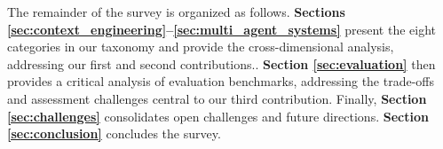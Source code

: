 The remainder of the survey is organized as follows. \textbf{Sections \ref{sec:context_engineering}–\ref{sec:multi_agent_systems}} present the eight categories in our taxonomy and provide the cross-dimensional analysis, addressing our first and second contributions.. \textbf{Section \ref{sec:evaluation}} then provides a critical analysis of evaluation benchmarks, addressing the trade-offs and assessment challenges central to our third contribution. Finally, \textbf{Section \ref{sec:challenges}} consolidates open challenges and future directions. \textbf{Section \ref{sec:conclusion}} concludes the survey.
